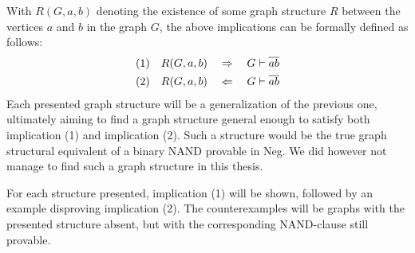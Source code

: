 With $R(G,a,b)$ denoting the existence of some graph structure $R$ between the vertices $a$ and $b$ in the graph $G$, the above implications can be formally defined as follows:
\begin{align}
  (1) \quad R(G,a,b) \quad \Rightarrow \quad G \vdash \ol{ab}\\
  (2) \quad R(G,a,b) \quad \Leftarrow \quad G \vdash \ol{ab}
\end{align}
Each presented graph structure will be a generalization of the previous one, ultimately aiming to find a graph structure general enough to satisfy both implication (1) and implication (2).
Such a structure would be the true graph structural equivalent of a binary NAND provable in Neg.
We did however not manage to find such a graph structure in this thesis.

For each structure presented, implication (1) will be shown, followed by an example disproving implication (2).
The counterexamples will be graphs with the presented structure absent, but with the corresponding NAND-clause still provable.

